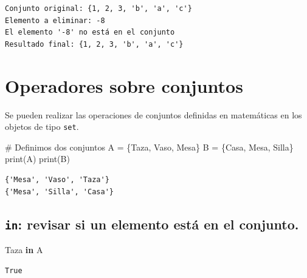\documentclass[
  spanish,
  letterpaper,
]{scrbook}
\newenvironment{Shaded}{\begin{snugshade}}{\end{snugshade}}
\newcommand{\BuiltInTok}[1]{\textcolor[rgb]{0.00,0.23,0.31}{#1}}
\newcommand{\CommentTok}[1]{\textcolor[rgb]{0.37,0.37,0.37}{#1}}
\newcommand{\KeywordTok}[1]{\textcolor[rgb]{0.00,0.23,0.31}{\textbf{#1}}}
\newcommand{\NormalTok}[1]{\textcolor[rgb]{0.00,0.23,0.31}{#1}}
\newcommand{\OperatorTok}[1]{\textcolor[rgb]{0.37,0.37,0.37}{#1}}
\newcommand{\StringTok}[1]{\textcolor[rgb]{0.13,0.47,0.30}{#1}}
\theoremstyle{definition}
\theoremstyle{remark}
\begin{document}
\begin{verbatim}
Conjunto original: {1, 2, 3, 'b', 'a', 'c'}
Elemento a eliminar: -8
El elemento '-8' no está en el conjunto
Resultado final: {1, 2, 3, 'b', 'a', 'c'}
\end{verbatim}

\section{Operadores sobre conjuntos}\label{operadores-sobre-conjuntos}

Se pueden realizar las operaciones de conjuntos definidas en matemáticas
en los objetos de tipo \texttt{set}.

\begin{Shaded}
\begin{Highlighting}[]
\CommentTok{\# Definimos dos conjuntos}
\NormalTok{A }\OperatorTok{=}\NormalTok{ \{}\StringTok{\textquotesingle{}Taza\textquotesingle{}}\NormalTok{, }\StringTok{\textquotesingle{}Vaso\textquotesingle{}}\NormalTok{, }\StringTok{\textquotesingle{}Mesa\textquotesingle{}}\NormalTok{\}}
\NormalTok{B }\OperatorTok{=}\NormalTok{ \{}\StringTok{\textquotesingle{}Casa\textquotesingle{}}\NormalTok{, }\StringTok{\textquotesingle{}Mesa\textquotesingle{}}\NormalTok{, }\StringTok{\textquotesingle{}Silla\textquotesingle{}}\NormalTok{\}}
\BuiltInTok{print}\NormalTok{(A)}
\BuiltInTok{print}\NormalTok{(B)}
\end{Highlighting}
\end{Shaded}

\begin{verbatim}
{'Mesa', 'Vaso', 'Taza'}
{'Mesa', 'Silla', 'Casa'}
\end{verbatim}

\subsection{\texorpdfstring{\texttt{in}: revisar si un elemento está en
el
conjunto.}{in: revisar si un elemento está en el conjunto.}}\label{in-revisar-si-un-elemento-estuxe1-en-el-conjunto.}

\begin{Shaded}
\begin{Highlighting}[]
\CommentTok{\textquotesingle{}Taza\textquotesingle{}} \KeywordTok{in}\NormalTok{ A}
\end{Highlighting}
\end{Shaded}

\begin{verbatim}
True
\end{verbatim}
\end{document}
